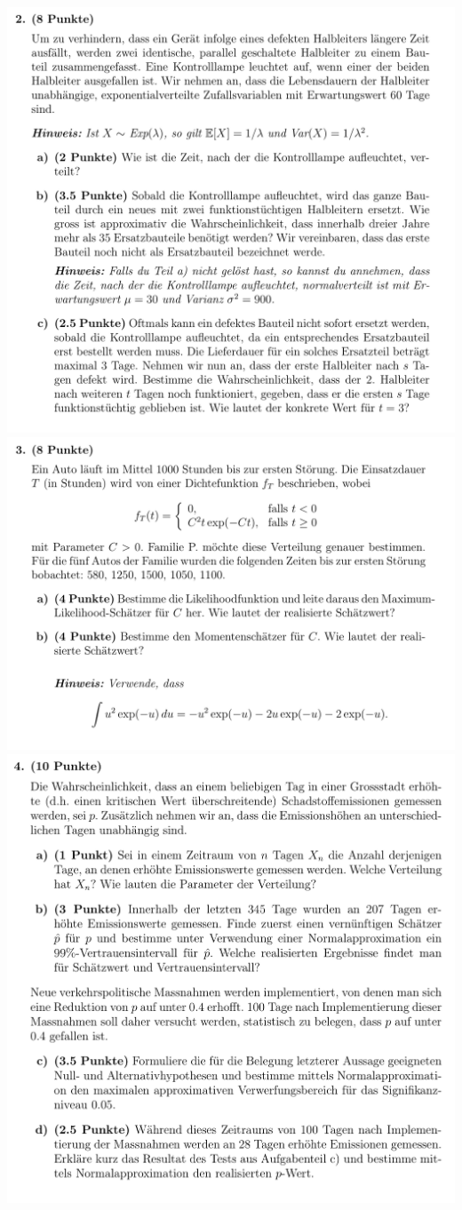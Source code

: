 \includegraphics[width=0.8\linewidth]{old_exams_prtsrc/aufgaben/sch_infk_so19_pr-06.png}\newline
\includegraphics[width=0.8\linewidth]{old_exams_prtsrc/aufgaben/sch_infk_so19_pr-07.png}\newline
\includegraphics[width=0.8\linewidth]{old_exams_prtsrc/aufgaben/sch_infk_so19_pr-08.png}\newline


